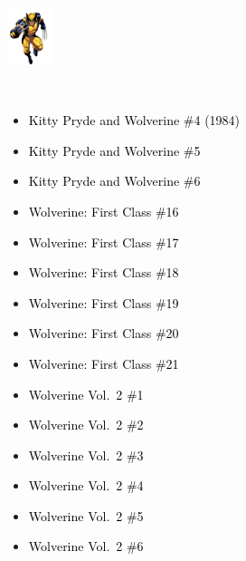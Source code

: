 \documentclass[12pt]{article}
\newcommand{\checkbox}{\raisebox{0.0ex}{\fbox{\rule{0ex}{1.5ex} \rule{1.5ex}{0ex}}}}
\begin{document}
\begin{center}
    \vspace*{2cm}
    \includegraphics[width=0.1\textwidth]{wolverine.png}
    \vspace{0.3cm}

    {\Huge \textbf{\textcolor{white}{Wolverine Chronological Checklist}}}
\end{center}

\vspace{0.3cm}
\noindent
\begin{tcolorbox}[
  colback=white!95!gray,
  colframe=black,
  width=\textwidth,
  arc=4mm,
  auto outer arc,
  boxrule=0.8pt,
  left=8pt,right=8pt,top=8pt,bottom=8pt
]
\begin{itemize}[left=0pt,label={\checkbox}]
  \item \textcolor{black}{Kitty Pryde and Wolverine \#4 (1984)}
  \item \textcolor{black}{Kitty Pryde and Wolverine \#5}
  \item \textcolor{black}{Kitty Pryde and Wolverine \#6}
  \item \textcolor{black}{Wolverine: First Class \#16}
  \item \textcolor{black}{Wolverine: First Class \#17}
  \item \textcolor{black}{Wolverine: First Class \#18}
  \item \textcolor{black}{Wolverine: First Class \#19}
  \item \textcolor{black}{Wolverine: First Class \#20}
  \item \textcolor{black}{Wolverine: First Class \#21}
  \item \textcolor{black}{Wolverine Vol.\ 2 \#1}
  \item \textcolor{black}{Wolverine Vol.\ 2 \#2}
  \item \textcolor{black}{Wolverine Vol.\ 2 \#3}
  \item \textcolor{black}{Wolverine Vol.\ 2 \#4}
  \item \textcolor{black}{Wolverine Vol.\ 2 \#5}
  \item \textcolor{black}{Wolverine Vol.\ 2 \#6}
\end{itemize}
\end{tcolorbox}
\end{document}
